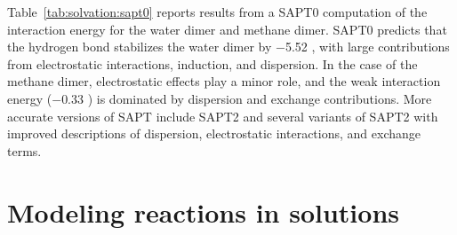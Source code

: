 \documentclass[../Main/notes.tex]{subfiles}
\begin{document}
Table~\ref{tab:solvation:sapt0} reports results from a SAPT0 computation of the interaction energy for the water dimer and methane dimer.
SAPT0 predicts that the hydrogen bond stabilizes the water dimer by $-$5.52 \kcal, with large contributions from electrostatic interactions, induction, and dispersion.
In the case of the methane dimer, electrostatic effects play a minor role, and the weak interaction energy ($-$0.33 \kcal) is dominated by dispersion and exchange contributions.
More accurate versions of SAPT include SAPT2 and several variants of SAPT2 with improved descriptions of dispersion, electrostatic interactions, and exchange terms.

\section{Modeling reactions in solutions}

\end{document}
